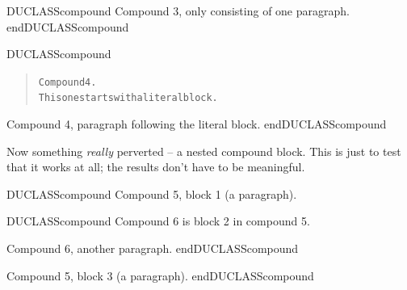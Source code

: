 \documentclass[a4paper]{article}
\newenvironment{DUclass}[1]%
    {%
     \def\DocutilsClassFunctionName{DUCLASS#1}
     \csname \DocutilsClassFunctionName \endcsname}%
    {\csname end\DocutilsClassFunctionName \endcsname}%
\begin{document}
\begin{DUclass}{compound}
Compound 3, only consisting of one paragraph.
\end{DUclass}

\begin{DUclass}{compound}
\begin{quote}
\begin{alltt}
Compound 4.
This one starts with a literal block.
\end{alltt}
\end{quote}
Compound 4, paragraph following the literal block.
\end{DUclass}

Now something \emph{really} perverted – a nested compound block.  This is
just to test that it works at all; the results don’t have to be
meaningful.

\begin{DUclass}{compound}
Compound 5, block 1 (a paragraph).

\begin{DUclass}{compound}
Compound 6 is block 2 in compound 5.

Compound 6, another paragraph.
\end{DUclass}

Compound 5, block 3 (a paragraph).
\end{DUclass}
\end{document}
